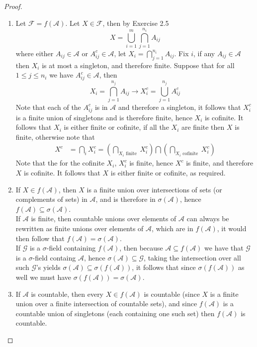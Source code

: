\documentclass[12pt]{article}
\newcommand{\F}{\mathcal{F}}
\newcommand{\A}{\mathcal{A}}
\newcommand{\G}{\mathcal{G}}
\newcommand{\seq}{\subseteq}
\begin{document}
\begin{proof}
    \begin{enumerate}
        \item Let $\F = f(\A)$. Let $X \in \F$, then by Exercise 2.5 
        \[ X = \bigcup_{i=1}^{m} \bigcap_{j=1}^{n_i} A_{ij} \]
        where either $A_{ij} \in \A$ or $A_{ij}^c \in \A$, let $X_i = \bigcap_{j=1}^{n_i} A_{ij}$. Fix $i$, if any $A_{ij} \in \A$ then $X_i$ is at most a singleton, and therefore finite. Suppose that for all $1 \leq j \leq n_i$ we have $A_{ij}^{c} \in \A$, then
        \[ X_{i} = \bigcap_{j=1}^{n_j} A_{ij} \longrightarrow X_{i}^{c} = \bigcup_{j=1}^{n_j} A_{ij}^{c} \]
        Note that each of the $A_{ij}^{c}$ is in $\A$ and therefore a singleton, it follows that $X_i^{c}$ is a finite union of singletons and is therefore finite, hence $X_i$ is cofinite. It follows that $X_i$ is either finite or cofinite, if all the $X_i$ are finite then $X$ is finite, otherwise note that
        \begin{align*}
            X^{c} &= \bigcap_i X_i^{c} = \left (\bigcap_{X_i \text { finite }} X_i^{c} \right) \bigcap \left (\bigcap_{X_{i} \text { cofinite }} X_i^{c} \right) 
        \end{align*}
        Note that the for the cofinite $X_i$, $X_i^{c}$ is finite, hence $X^{c}$ is finite, and therefore $X$ is cofinite. It follows that $X$ is either finite or cofinite, as required.
        \item If $X \in f(\A)$, then $X$ is a finite union over intersections of sets (or complements of sets) in $\A$, and is therefore in $\sigma (\A)$, hence $f(\A) \seq \sigma (\A)$. \\
        If $\A$ is finite, then countable unions over elements of $\A$ can always be rewritten as finite unions over elements of $\A$, which are in $f(\A)$, it would then follow that $f(\A) = \sigma (\A)$. \\
        If $\G$ is a $\sigma$-field containing $f(\A)$, then because $\A \seq f(\A)$ we have that $\G$ is a $\sigma$-field containg $\A$, hence $\sigma (\A) \seq \G$, taking the intersection over all such $\G$'s yields $\sigma (\A) \seq \sigma (f (\A))$, it follows that since $\sigma (f(\A))$ as well we must have $\sigma (f(\A)) = \sigma (\A)$. 
        \item If $\A$ is countable, then every $X \in f(\A)$ is countable (since $X$ is a finite union over a finite intersection of countable sets), and since $f(\A)$ is a countable union of singletons (each containing one such set) then $f(\A)$ is countable.

\end{enumerate}
\end{proof}
\end{document}
